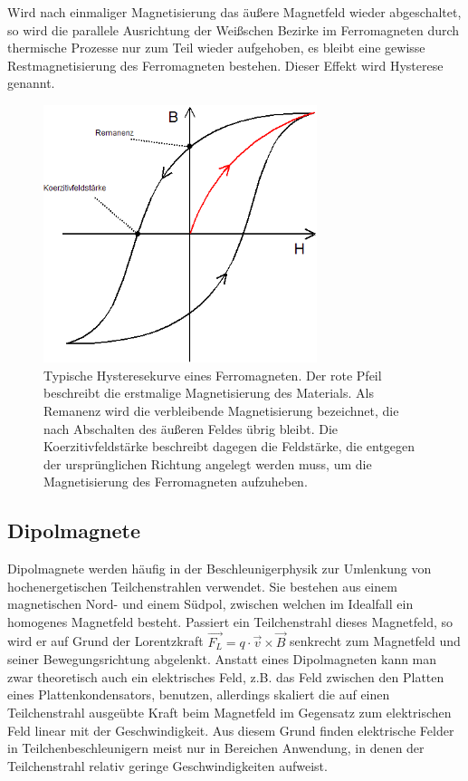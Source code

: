 \documentclass[bigchapter,colorback,accentcolor=tud4b,linedtoc,11pt]{tudreport}
\begin{document}
Wird nach einmaliger Magnetisierung das äußere Magnetfeld wieder abgeschaltet, so wird die parallele Ausrichtung der Weißschen Bezirke im Ferromagneten durch thermische Prozesse nur zum Teil wieder aufgehoben, es bleibt eine gewisse Restmagnetisierung des Ferromagneten bestehen. Dieser Effekt wird Hysterese genannt.

\begin{figure}[H]
\centering
\includegraphics[width=80mm]{img/hysterese.png}
\caption{Typische Hysteresekurve eines Ferromagneten. Der rote Pfeil beschreibt die erstmalige Magnetisierung des Materials. Als Remanenz wird die verbleibende Magnetisierung bezeichnet, die nach Abschalten des äußeren Feldes übrig bleibt. Die Koerzitivfeldstärke beschreibt dagegen die Feldstärke, die entgegen der ursprünglichen Richtung angelegt werden muss, um die Magnetisierung des Ferromagneten aufzuheben\cite{hysterese}.}
\end{figure}

\subsection{Dipolmagnete}

Dipolmagnete werden häufig in der Beschleunigerphysik zur Umlenkung von hochenergetischen Teilchenstrahlen verwendet. Sie bestehen aus einem magnetischen Nord- und einem Südpol, zwischen welchen im Idealfall ein homogenes Magnetfeld besteht. Passiert ein Teilchenstrahl dieses Magnetfeld, so wird er auf Grund der Lorentzkraft $\vec{F_L} = q \cdot \vec{v} \times \vec{B}$ senkrecht zum Magnetfeld und seiner Bewegungsrichtung abgelenkt. Anstatt eines Dipolmagneten kann man zwar theoretisch auch ein elektrisches Feld, z.B. das Feld zwischen den Platten eines Plattenkondensators, benutzen, allerdings skaliert die auf einen Teilchenstrahl ausgeübte Kraft beim Magnetfeld im Gegensatz zum elektrischen Feld linear mit der Geschwindigkeit. Aus diesem Grund finden elektrische Felder in Teilchenbeschleunigern meist nur in Bereichen Anwendung, in denen der Teilchenstrahl relativ geringe Geschwindigkeiten aufweist.
\end{document}
